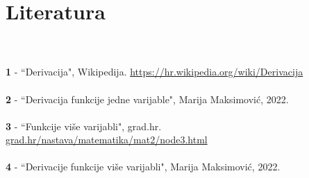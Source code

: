 \documentclass{article}
\begin{document}
\pagebreak

\section{Literatura}
\\~\\
\textbf{1} - ``Derivacija", Wikipedija. \href{https://hr.wikipedia.org/wiki/Derivacija}{https://hr.wikipedia.org/wiki/Derivacija}
\\~\\
\textbf{2} - ``Derivacija funkcije jedne varijable", Marija Maksimović, 2022.
\\~\\
\textbf{3} - ``Funkcije više varijabli", grad.hr. \href{http://www.grad.hr/nastava/matematika/mat2/node3.html}{grad.hr/nastava/matematika/mat2/node3.html}
\\~\\
\textbf{4} - ``Derivacije funkcije više varijabli", Marija Maksimović, 2022.
\end{document}
